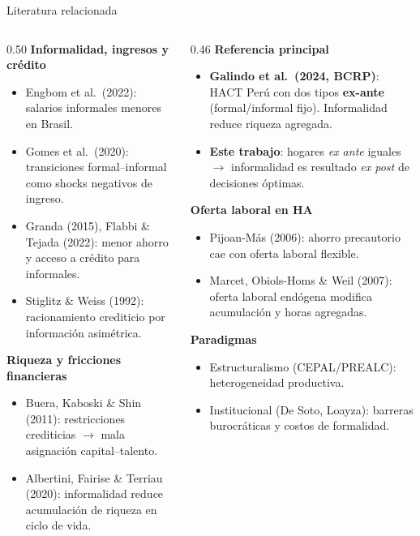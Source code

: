 \documentclass[aspectratio=169,11pt]{beamer}
\begin{document}
\begin{frame}{Literatura relacionada}
  \footnotesize
  \begin{columns}[T,onlytextwidth]
    \begin{column}{0.50\textwidth}
      \textbf{Informalidad, ingresos y cr\'edito}
      \begin{itemize}
        \item Engbom et al.\ (2022): salarios informales menores en Brasil.
        \item Gomes et al.\ (2020): transiciones formal--informal como shocks negativos de ingreso.
        \item Granda (2015), Flabbi \& Tejada (2022): menor ahorro y acceso a cr\'edito para informales.
        \item Stiglitz \& Weiss (1992): racionamiento crediticio por informaci\'on asim\'etrica.
      \end{itemize}
      \vspace{0.1cm}
      \textbf{Riqueza y fricciones financieras}
      \begin{itemize}
        \item Buera, Kaboski \& Shin (2011): restricciones crediticias $\rightarrow$ mala asignaci\'on capital--talento.
        \item Albertini, Fairise \& Terriau (2020): informalidad reduce acumulaci\'on de riqueza en ciclo de vida.
      \end{itemize}
    \end{column}
    \begin{column}{0.46\textwidth}
      \textbf{Referencia principal}
      \begin{itemize}
        \item \textbf{Galindo et al.\ (2024, BCRP)}: HACT Per\'u con dos tipos \textbf{ex-ante} (formal/informal fijo). Informalidad reduce riqueza agregada.
        \item \textbf{Este trabajo}: hogares \textit{ex ante} iguales $\rightarrow$ informalidad es resultado \textit{ex post} de decisiones \'optimas.
      \end{itemize}
      \vspace{0.1cm}
      \textbf{Oferta laboral en HA}
      \begin{itemize}
        \item Pijoan-M\'as (2006): ahorro precautorio cae con oferta laboral flexible.
        \item Marcet, Obiols-Homs \& Weil (2007): oferta laboral end\'ogena modifica acumulaci\'on y horas agregadas.
      \end{itemize}
      \vspace{0.1cm}
      \textbf{Paradigmas}
      \begin{itemize}
        \item Estructuralismo (CEPAL/PREALC): heterogeneidad productiva.
        \item Institucional (De Soto, Loayza): barreras burocr\'aticas y costos de formalidad.
      \end{itemize}
    \end{column}
  \end{columns}
\end{frame}
\end{document}
